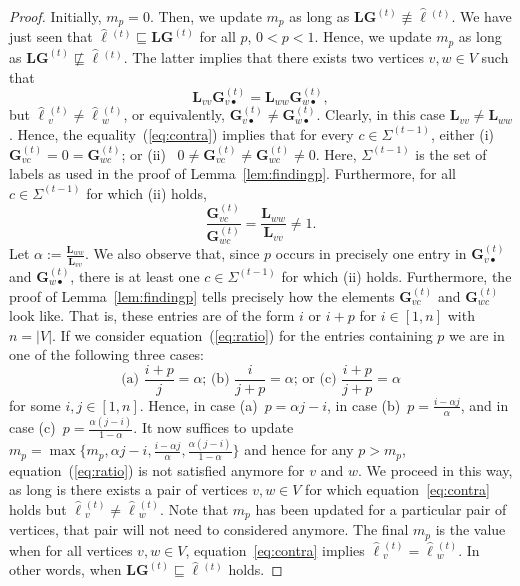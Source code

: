 \begin{proof}
Initially, $m_p=0$. Then, we update $m_p$ as long as
$\mathbf{L}\mathbf{G}^{(t)}\not\equiv\hat{\pmb{\ell}}{}^{(t)}$. We have just seen that
$\hat{\pmb{\ell}}{}^{(t)}\sqsubseteq \mathbf{L}\mathbf{G}^{(t)}$ for all $p$, $0<p<1$.
Hence, we update $m_p$ as long as $\mathbf{L}\mathbf{G}^{(t)}\not\sqsubseteq\hat{\pmb{\ell}}{}^{(t)}$.
The latter implies that
there exists two vertices $v,w\in V$ such that
\begin{equation}
\mathbf{L}_{vv}\mathbf{G}^{(t)}_{v\bullet}=\mathbf{L}_{ww}\mathbf{G}^{(t)}_{w\bullet},\label{eq:contra}
\end{equation}
but $\hat{\pmb{\ell}}{}^{(t)}_v\neq \hat{\pmb{\ell}}{}^{(t)}_w$, or equivalently, $\mathbf{G}^{(t)}_{v\bullet}\neq \mathbf{G}^{(t)}_{w\bullet}$.
Clearly, in this case $\mathbf{L}_{vv}\neq\mathbf{L}_{ww}$. Hence, the equality~(\ref{eq:contra}) implies that for every $c\in\Sigma^{(t-1)}$, either
(i)~$\mathbf{G}^{(t)}_{vc}=0=\mathbf{G}^{(t)}_{wc}$; or (ii)~ $0\neq \mathbf{G}^{(t)}_{vc}\neq \mathbf{G}^{(t)}_{wc}\neq 0$. Here, $\Sigma^{(t-1)}$ is the set of labels as used in the proof of  Lemma~\ref{lem:findingp}. Furthermore, for all $c\in\Sigma^{(t-1)}$ for which (ii) holds, 
\begin{equation}
\frac{\mathbf{G}^{(t)}_{vc}}{\mathbf{G}^{(t)}_{wc}}=\frac{\mathbf{L}_{ww}}{\mathbf{L}_{vv}}\neq 1.\label{eq:ratio}
\end{equation}
Let $\alpha:=\frac{\mathbf{L}_{ww}}{\mathbf{L}_{vv}}$.
We also observe that, since $p$ occurs in precisely one entry in $\mathbf{G}^{(t)}_{v\bullet}$ and $\mathbf{G}^{(t)}_{w\bullet}$, there is at least one $c\in\Sigma^{(t-1)}$ for which (ii) holds. Furthermore, the proof of  Lemma~\ref{lem:findingp} tells precisely how the elements $\mathbf{G}^{(t)}_{vc}$ and $\mathbf{G}^{(t)}_{wc}$ look like. That is, these entries are of the form 
$i$ or $i+p$ for $i\in[1,n]$ with $n=|V|$. If we consider equation~(\ref{eq:ratio}) for
the entries containing $p$ we are in one of the following three cases:
$$
\text{(a) } \frac{i+p}{j}=\alpha
\text{; (b) } \frac{i}{j+p}=\alpha
\text{; or (c) } \frac{i+p}{j+p}=\alpha
$$
for some $i,j\in[1,n]$. Hence, in case (a)~$p=\alpha j- i$, in case (b)~$p=\frac{i-\alpha j}{\alpha}$, and in case (c)~$p=\frac{\alpha(j-i)}{1-\alpha}$. It now suffices to update
$m_p=\max\{m_p,\alpha j- i,\frac{i-\alpha j}{\alpha},\frac{\alpha(j-i)}{1-\alpha}\}$ and
hence for any $p>m_p$, equation~(\ref{eq:ratio}) is not satisfied anymore for $v$ and $w$.
We proceed in this way, as long is there exists a pair of vertices  $v,w\in V$ for which equation~\ref{eq:contra} holds  but $\hat{\pmb{\ell}}{}^{(t)}_v\neq \hat{\pmb{\ell}}{}^{(t)}_w$. Note that $m_p$ has been updated for a particular pair of vertices, that pair will not need to considered anymore. The final $m_p$ is the value when
for all vertices $v,w\in V$, equation~\ref{eq:contra} implies $\hat{\pmb{\ell}}{}^{(t)}_v= \hat{\pmb{\ell}}{}^{(t)}_w$. In other words, when $\mathbf{L}\mathbf{G}^{(t)}\sqsubseteq\hat{\pmb{\ell}}{}^{(t)}$ holds.


\end{proof}
